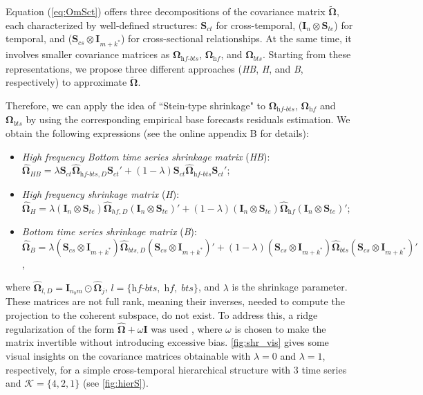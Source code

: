 \documentclass[review, 11pt]{elsarticle}
\newcommand{\Ivet}{\bm{I}}
\newcommand{\Svet}{\bm{S}}
\newcommand{\Omegavet}{\bm{\Omega}}
\theoremstyle{definition}
\begin{document}
{\color{blue}Equation (\ref{eq:OmSct}) offers three decompositions of the covariance matrix $\widetilde{\Omegavet}$, each characterized by well-defined structures: $\Svet_{ct}$ for cross-temporal, ($\Ivet_n \otimes \Svet_{te}$) for temporal, and ($\Svet_{cs} \otimes \Ivet_{m+k^\ast}$) for cross-sectional relationships. At the same time, it involves smaller covariance matrices %
as $\Omegavet_{\textit{hf-bts}}$, $\Omegavet_{\textit{hf}}$, and $\Omegavet_{\textit{bts}}$. Starting from these representations, we propose three different approaches (\textit{HB}, \textit{H}, and \textit{B}, respectively) to approximate $\widetilde{\Omegavet}$.}

Therefore, we can apply the idea of “Stein-type shrinkage" \citep{efron1977} to $\Omegavet_{\textit{hf-bts}}$, $\Omegavet_{\textit{hf}}$ and $\Omegavet_{\textit{bts}}$ by using the corresponding empirical base forecasts residuals estimation. We obtain the following expressions (see the online appendix B for details):
\begin{itemize}[nosep]
	\item \textit{High frequency Bottom time series shrinkage matrix} (\textit{HB}): \\
	$\widehat{\Omegavet}_{HB} = \lambda \Svet_{ct}\widehat{\Omegavet}_{\textit{hf-bts}, D}\Svet_{ct}'+ (1-\lambda) \Svet_{ct}\widehat{\Omegavet}_{\textit{hf-bts}}\Svet_{ct}'$;
	\item \textit{High frequency shrinkage matrix} (\textit{H}): \\ $\widehat{\Omegavet}_{H}  = \lambda (\Ivet_{n} \otimes \Svet_{te})\widehat{\Omegavet}_{hf, D}(\Ivet_{n} \otimes \Svet_{te})' + (1-\lambda) (\Ivet_{n} \otimes \Svet_{te})\widehat{\Omegavet}_{\textit{hf}}(\Ivet_{n} \otimes \Svet_{te})'$;
	\item \textit{Bottom time series shrinkage matrix} (\textit{B}): \\$\widehat{\Omegavet}_{B} = \lambda \left(\Svet_{cs} \otimes \Ivet_{m+k^\ast}\right)\widehat{\Omegavet}_{bts, D}\left(\Svet_{cs} \otimes \Ivet_{m+k^\ast}\right)' +  (1-\lambda) \left(\Svet_{cs} \otimes \Ivet_{m+k^\ast}\right)\widehat{\Omegavet}_{bts}\left(\Svet_{cs} \otimes \Ivet_{m+k^\ast}\right)'$,
\end{itemize}
where $\widehat{\Omegavet}_{l, D} = \Ivet_{n_b m}\odot\widehat{\Omegavet}_{j}$, $l = \{\textit{hf-bts}, \;\textit{hf}, \;\textit{bts}\}$, and $\lambda$ is the shrinkage parameter.
These matrices are not full rank, meaning their inverses, needed to compute the projection to the coherent subspace, do not exist. To address this, a ridge regularization of the form $\widehat{\Omegavet} + \omega \Ivet$ was used \citep{marquardt1970t}, where $\omega$ is chosen to make the matrix invertible without introducing excessive bias. \autoref{fig:shr_vis} gives some visual insights on the covariance matrices obtainable with $\lambda = 0$ and $\lambda = 1$, respectively, for a simple cross-temporal hierarchical structure with 3 time series and $\mathcal{K} = \{4,2,1\}$ (see \autoref{fig:hierS}).
\end{document}
